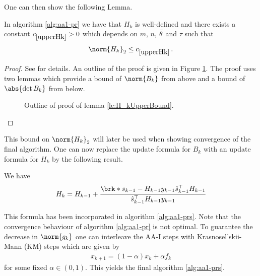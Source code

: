 One can then show the following Lemma.
\begin{lemma}\label{le:H_kUpperBound}
	In algorithm \ref{alg:aa1-pr} we have that $H_k$ is well-defined and there exists a constant $\useconstant{upperHk}>0$ which depends on $m$, $n$, $\bar{\theta}$ and $\tau$ such that
	\begin{align*}
		\norm{H_k}_2\leq \useconstant{upperHk}\,.
	\end{align*}
\end{lemma}
\begin{proof}
	See \cite[Corollary 4]{ZhaAA} for details. An outline of the proof is given in Figure \ref{fig:Diagram_001}. The proof uses two lemmas which provide a bound of $\norm{B_k}$ from above and a bound of $\abs{\det B_k}$ from below.
	
	\begin{figure}
	\centering
	\scalebox{0.7}{{\normalsize
	
	}}
	\caption{Outline of proof of lemma \ref{le:H_kUpperBound}.}
	\label{fig:Diagram_001}
	\end{figure}
\end{proof}
This bound on $\norm{H_k}_2$ will later be used when showing convergence of the final algorithm. One can now replace the update formula for $B_k$ with an update formula for $H_k$ by the following result.
\begin{proposition}
	We have
	\begin{align*}
		H_{k} = H_{k-1}+\frac{\brk*{s_{k-1}-H_{k-1}y_{k-1}}\hs_{k-1}^\top H_{k-1}}{\hs_{k-1}^\top H_{k-1}y_{k-1}}
	\end{align*}
\end{proposition}
This formula has been incorporated in algorithm \ref{alg:aa1-prs}.
Note that the convergence behaviour of algorithm \ref{alg:aa1-pr} is not optimal.
To guarantee the decrease in $\norm{g_k}$ one can interleave the AA-I steps with Krasnosel'skii-Mann (KM) steps which are given by
\begin{align*}
	x_{k+1}= (1-\alpha)x_k +\alpha f_k
\end{align*}
for some fixed $\alpha\in(0,1)$. This yields the final algorithm \ref{alg:aa1-prs}.

